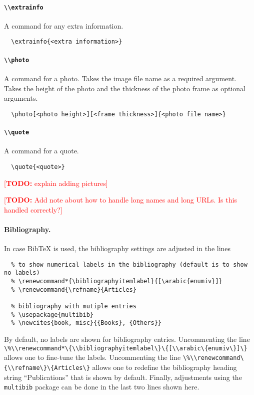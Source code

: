 \documentclass[a4paper, 11pt]{article}
\newcommand{\todox}[1]{\textcolor{red}{[\textbf{TODO:} #1]}}
\newcommand{\code}[1]{\lstinline!#1!}
\begin{document}
\paragraph{\code{\\extrainfo}}
A command for any extra information.
\begin{lstlisting}
  \extrainfo{<extra information>}
\end{lstlisting}

\paragraph{\code{\\photo}}
A command for a photo.
Takes the image file name as a required argument.
Takes the height of the photo and the thickness of the photo frame as optional arguments.
\begin{lstlisting}
  \photo[<photo height>][<frame thickness>]{<photo file name>}
\end{lstlisting}

\paragraph{\code{\\quote}}
A command for a quote.
\begin{lstlisting}
  \quote{<quote>}
\end{lstlisting}

\todox{explain adding pictures}

\todox{Add note about how to handle long names and long URLs. Is this handled correctly?}

\paragraph{Bibliography.}
In case BibTeX is used, the bibliography settings are adjusted in the lines
\begin{lstlisting}
  % to show numerical labels in the bibliography (default is to show no labels)
  % \renewcommand*{\bibliographyitemlabel}{[\arabic{enumiv}]}
  % \renewcommand{\refname}{Articles}

  % bibliography with mutiple entries
  % \usepackage{multibib}
  % \newcites{book, misc}{{Books}, {Others}}
\end{lstlisting}
By default, no labels are shown for bibliography entries.
Uncommenting the line \code{\%\\renewcommand*\{\\bibliographyitemlabel\}\{[\\arabic\{enumiv\}]\}}
allows one to fine-tune the labels.
Uncommenting the line \code{\%\\renewcommand\{\\refname\}\{Articles\}} allows one to redefine the bibliography heading string ``Publications'' that is shown by default.
Finally, adjustments using the \code{multibib} package can be done in the last two lines shown here.
\end{document}

